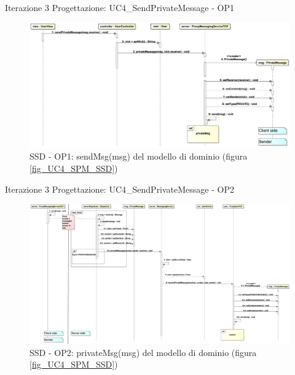\documentclass[t]{beamer} %
\begin{document}
\begin{frame} {Iterazione 3 Progettazione: UC4\_SendPrivateMessage - OP1}
   \begin{figure}
     \includegraphics[scale=0.22]{image_astah/Iteration_3_DesignModel/UC4_SendPrivateMessage_SSD_1_sendMsg.png}{\centering}
     \caption{SSD - OP1: sendMsg(msg) del modello di dominio (figura \ref{fig_UC4_SPM_SSD}) }
     \label{fig_UC4_SSD_SRM_1} 
   \end{figure}
\end{frame}

\begin{frame} {Iterazione 3 Progettazione: UC4\_SendPrivateMessage - OP2}
   \begin{figure}
     \includegraphics[scale=0.14]{image_astah/Iteration_3_DesignModel/UC4_SendPrivateMessage_SSD_2_privateMsg}{\centering}
     \caption{SSD - OP2: privateMsg(msg) del modello di dominio (figura \ref{fig_UC4_SPM_SSD}) }
     \label{fig_UC4_SSD_SRM_2} 
   \end{figure}
\end{frame}
\end{document}
